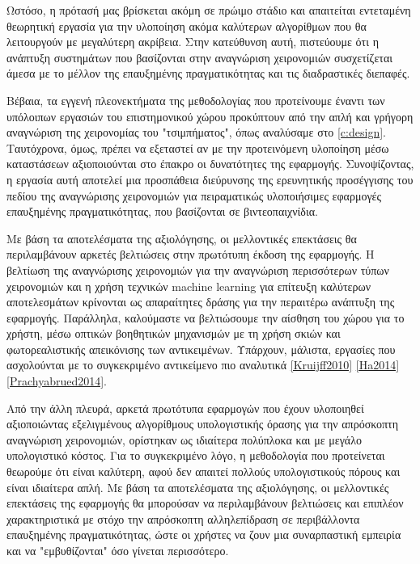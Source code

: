 Ωστόσο, η πρότασή μας βρίσκεται ακόμη σε πρώιμο στάδιο και απαιτείται εντεταμένη θεωρητική εργασία για την υλοποίηση ακόμα καλύτερων αλγορίθμων που θα λειτουργούν με μεγαλύτερη ακρίβεια. Στην κατεύθυνση αυτή, πιστεύουμε ότι η ανάπτυξη συστημάτων που βασίζονται στην αναγνώριση χειρονομιών συσχετίζεται άμεσα με το μέλλον της επαυξημένης πραγματικότητας και τις διαδραστικές διεπαφές.

Βέβαια, τα εγγενή πλεονεκτήματα της μεθοδολογίας που προτείνουμε έναντι των υπόλοιπων εργασιών του επιστημονικού χώρου προκύπτουν από την απλή και γρήγορη αναγνώριση της χειρονομίας του "τσιμπήματος", όπως αναλύσαμε στο \ref{c:design}. Ταυτόχρονα, όμως, πρέπει να εξεταστεί αν με την προτεινόμενη υλοποίηση μέσω καταστάσεων αξιοποιούνται στο έπακρο οι δυνατότητες της εφαρμογής. Συνοψίζοντας, η εργασία αυτή αποτελεί μια προσπάθεια διεύρυνσης της ερευνητικής προσέγγισης του πεδίου της αναγνώρισης χειρονομιών για πειραματικώς υλοποιήσιμες εφαρμογές επαυξημένης πραγματικότητας, που βασίζονται σε βιντεοπαιχνίδια.



Με βάση τα αποτελέσματα της αξιολόγησης, οι μελλοντικές επεκτάσεις θα περιλαμβάνουν αρκετές βελτιώσεις στην πρωτότυπη έκδοση της εφαρμογής. Η βελτίωση της αναγνώρισης χειρονομιών για την αναγνώριση περισσότερων τύπων χειρονομιών και η χρήση τεχνικών machine learning για επίτευξη καλύτερων αποτελεσμάτων κρίνονται ως απαραίτητες δράσης για την περαιτέρω ανάπτυξη της εφαρμογής. Παράλληλα, καλούμαστε να βελτιώσουμε την αίσθηση του χώρου για το χρήστη, μέσω οπτικών βοηθητικών μηχανισμών με τη χρήση σκιών και φωτορεαλιστικής απεικόνισης των αντικειμένων. Υπάρχουν, μάλιστα, εργασίες που ασχολούνται με το συγκεκριμένο αντικείμενο πιο αναλυτικά \ref{Kruijff2010} \ref{Ha2014} \ref{Prachyabrued2014}.



Από την άλλη πλευρά, αρκετά πρωτότυπα εφαρμογών που έχουν υλοποιηθεί αξιοποιώντας εξελιγμένους αλγορίθμους υπολογιστικής όρασης για την απρόσκοπτη αναγνώριση χειρονομιών, ορίστηκαν ως ιδιαίτερα πολύπλοκα και με μεγάλο υπολογιστικό κόστος. Για το συγκεκριμένο λόγο, η μεθοδολογία που προτείνεται θεωρούμε ότι είναι καλύτερη, αφού δεν απαιτεί πολλούς υπολογιστικούς πόρους και είναι ιδιαίτερα απλή. Με βάση τα αποτελέσματα της αξιολόγησης, οι μελλοντικές επεκτάσεις της εφαρμογής θα μπορούσαν να περιλαμβάνουν βελτιώσεις και επιπλέον χαρακτηριστικά με στόχο την απρόσκοπτη αλληλεπίδραση σε περιβάλλοντα επαυξημένης πραγματικότητας, ώστε οι χρήστες να ζουν μια συναρπαστική εμπειρία και να "εμβυθίζονται" όσο γίνεται περισσότερο. 



